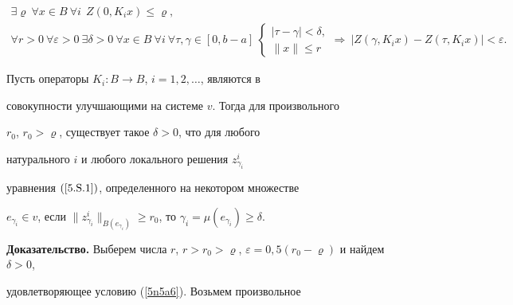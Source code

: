 \begin{gather}\label{5n5a5}


\exists \varrho \ \forall x\in B \ \forall i


\ \ Z(0,K_i x)\leqslant \varrho, \\


%


\label{5n5a6}


\forall r>0 \ \forall \varepsilon>0


\ \exists \delta>0 \ \forall x\in B \ \forall i


\ \forall \tau,\gamma\in [0,b-a]\ 


\begin{cases}


|\tau-\gamma|<\delta,\\


\| x \|\leqslant r


\end{cases} \Rightarrow \ |Z(\gamma,K_i x)-Z(\tau, K_i x)|<\varepsilon.


\end{gather}








\begin{lem}


Пусть операторы $K_{i}: B \to B$, $i=1, 2, \dotsc$, являются в


совокупности улучшающими на системе $v$. Тогда для произвольного


$r_0$, $r_0>\varrho$, существует такое $\delta>0$, что для любого


натурального $i$ и любого локального решения $z_{\gamma_i}^i$


уравнения $(\ref{5.S.1})$, определенного на некотором множестве


$e_{\gamma_i}\in v$, если $\|z_{\gamma_i}^i\|_{B(e_{\gamma_i})}


\geqslant r_0$, то $\gamma_i =\mu(e_{\gamma_i})\geqslant\delta$.


\end{lem}








{\bf Доказательство.} Выберем числа $r$, $r>r_0


>\varrho$, $\varepsilon=0{,}5 (r_0 -\varrho)$ и найдем $\delta>0$,


удовлетворяющее условию (\ref{5n5a6}). Возьмем произвольное


